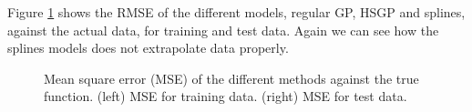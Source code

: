 \documentclass[]{interact}
\theoremstyle{plain}%
\theoremstyle{definition}
\theoremstyle{remark}
\begin{document}
Figure \ref{fig14_MSE_train_gaydata} shows the RMSE of the different models, regular GP, HSGP and splines, against the actual data, for training and test data. Again we can see how the splines models does not extrapolate data properly.

\begin{figure}[H]
\centering
{}
\caption{Mean square error (MSE) of the different methods against the true function. (left) MSE for training data. (right) MSE for test data.}
  \label{fig14_MSE_train_gaydata}
\end{figure}
\end{document}
